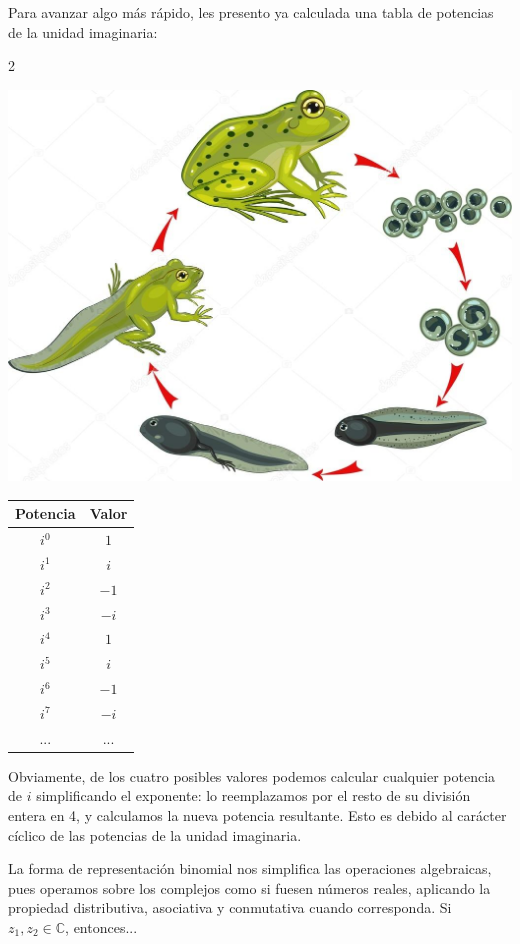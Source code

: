 \documentclass[12pt]{article}
\theoremstyle{definition}
\begin{document}
Para avanzar algo m\'as r\'apido, les presento ya calculada una tabla de potencias de la unidad imaginaria:

\begin{multicols} {2}

\includegraphics[scale=0.18]{ciclo.jpg}

\begin{center}
	\begin{tabular}{cc}
	Potencia & Valor\\
	\hline
	$i^0$ & $1$\\
	$i^1$ & $i$\\
	$i^2$ & $-1$\\
	$i^3$ & $-i$\\
	$i^4$ & $1$\\
	$i^5$ & $i$\\
	$i^6$ & $-1$\\
	$i^7$ & $-i$\\
	... & ...
	\end{tabular}
\end{center}

\end{multicols}

Obviamente, de los cuatro posibles valores podemos calcular cualquier potencia de $i$ simplificando el exponente: lo reemplazamos por el resto de su divisi\'on entera en 4, y calculamos la nueva potencia resultante. Esto es debido al car\'acter c\'iclico de las potencias de la unidad imaginaria.

La forma de representaci\'on binomial nos simplifica las operaciones algebraicas, pues operamos sobre los complejos como si fuesen n\'umeros reales, aplicando la propiedad distributiva, asociativa y conmutativa cuando corresponda.
Si $z_1, z_2 \in \mathbb{C}$, entonces...
\end{document}
